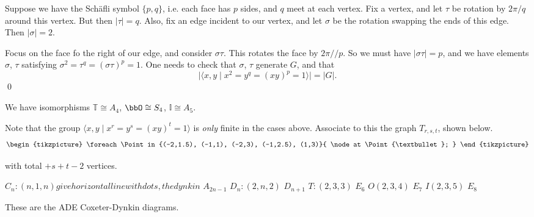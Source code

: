 \pfsk Suppose we have the Sch\"afli symbol $\{p,q\}$, i.e. each face has $p$ sides, and $q$ meet at each vertex. Fix a vertex, and let $\tau$ be rotation by $2\pi/q$ around this vertex. But then $|\tau|=q$. Also, fix an edge incident to our vertex, and let $\sigma$ be the rotation swapping the ends of this edge. Then $|\sigma|=2$. 


Focus on the face fo the right of our edge, and consider $\sigma\tau$. This rotates the face by $2\pi//p$. So we must have $|\sigma\tau|=p$, and we have elements $\sigma$, $\tau$ satisfying $\sigma^2=\tau^q=(\sigma\tau)^p=1$. One needs to check that $\sigma$, $\tau$ generate $G$, and that
	\[
	|\langle x,y \;|\; x^2=y^q=(xy)^p=1 \rangle| = |G|.
	\]
\qed \\

 
\begin{cor}
We have isomorphisms $\mathbb{T} \cong A_4$, $\bbO \cong S_4$, $\mathbb{I} \cong A_5$. 
\end{cor}

 Note that the group $\langle x,y \;|\; x^r=y^s=(xy)^t=1\rangle$ is \emph{only} finite in the cases above. Associate to this the graph $T_{r,s,t}$, shown below.
 	\[
	\begin{tikzpicture}
	\foreach \Point in {(-2,1.5), (-1,1), (-2,3), (-1,2.5), (1,3)}{
    \node at \Point {\textbullet};
}
	\end{tikzpicture}
	\]

with total $+s+t-2$ vertices. 

$C_n: (n,1,n) give horizontal line with dots, the dynkin$ $A_{2n-1}$
$D_n: (2,n,2)$  $D_{n+1}$
$T: (2,3,3)$ $E_6$
$O(2,3,4)$ $E_7$
$I(2,3,5)$ $E_8$

These are the ADE Coxeter-Dynkin diagrams. 














